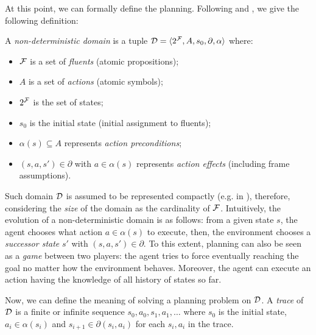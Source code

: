 At this point, we can formally define the \FOND planning. Following \citep{ghallab2004automated} and \citep{geffner2013concise}, we give the following definition:
\begin{definition}
A \textit{non-deterministic domain} is a tuple $\mathcal{D} = \langle 2^{\mathcal{F}}, A, s_0, \partial, \alpha \rangle$ where:
\begin{itemize}
\item $\mathcal{F}$ is a set of \textit{fluents} (atomic propositions);
\item $A$ is a set of \textit{actions} (atomic symbols);
\item $2^{\mathcal{F}}$ is the set of states;
\item $s_0$ is the initial state (initial assignment to fluents);
\item $\alpha(s) \subseteq A$ represents \textit{action preconditions};
\item $(s, a, s') \in \partial$ with $a \in \alpha(s)$ represents \textit{action effects} (including frame assumptions).
\end{itemize}
\end{definition}
\noindent Such domain $\mathcal{D}$ is assumed to be represented compactly (e.g. in \PDDL), therefore, considering the \textit{size} of the domain as the cardinality of $\mathcal{F}$. Intuitively, the evolution of a non-deterministic domain is as follows: from a given state $s$, the agent chooses what action $a \in \alpha(s)$ to execute, then, the environment chooses a \textit{successor state} $s'$ with $(s,a,s') \in \partial$. To this extent, planning can also be seen as a \textit{game} between two players: the agent tries to force eventually reaching the goal no matter how the environment behaves.
Moreover, the agent can execute an action having the knowledge of all history of states so far.

Now, we can define the meaning of solving a \FOND planning problem on $\mathcal{D}$. A \textit{trace} of $\mathcal{D}$ is a finite or infinite sequence $s_0,a_0,s_1,a_1, \dots$ where $s_0$ is the initial state, $a_i \in \alpha(s_i)$ and $s_{i+1} \in \partial(s_i,a_i)$ for each $s_i,a_i$ in the trace.

